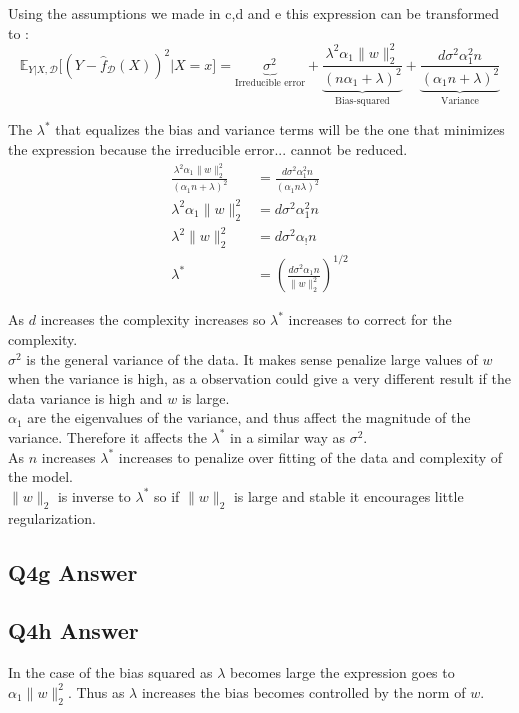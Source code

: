 \documentclass{article}
\newcommand{\1}{\mathbf{1}}
\def\E{\mathbb{E}}
\newcommand{\mc}[1]{\mathcal{#1}}
\begin{document}
Using the assumptions we made in c,d and e this expression can be transformed to :
$$\E_{Y|X,\mc{D}}\big[(Y-\widehat{f}_{\mc{D}}(X))^2 |X=x \big] = \underbrace{\sigma^2}_{\text{Irreducible error}} + \underbrace{\frac{\lambda^2 \alpha_1 \|w\|_2^2}{(n \alpha_1 + \lambda)^2}}_{\text{Bias-squared}} +
          \underbrace{\frac{d \sigma^2 \alpha_1^2 n}{(\alpha_1 n + \lambda)^2}}_{\text{Variance}} $$
    
The $\lambda^*$ that equalizes the bias and variance terms will be the one that minimizes the expression because the irreducible error... cannot be reduced.
\begin{align}
    \frac{\lambda^2\alpha_1\|w\|_2^2}{(\alpha_1 n + \lambda)^2} &= \frac{d\sigma^2 \alpha_1^2 n}{(\alpha_1 n 
    \lambda)^2}\\
    \lambda^2\alpha_1\|w\|_2^2 &= d\sigma^2\alpha_1^2 n\\
    \lambda^2\|w\|_2^2 &= d\sigma^2\alpha_! n\\
    \lambda^* &= \left(\frac{d\sigma^2\alpha_1 n}{\|w\|_2^2}\right)^{1/2}
\end{align}

As $d$ increases the complexity increases so $\lambda^*$ increases to correct for the complexity. \\
$\sigma^2$ is the general variance of the data. It makes sense penalize large values of $w$ when the variance is high, as a observation could give a very different result if the data variance is high and $w$ is large. \\
$\alpha_1$ are the eigenvalues of the variance, and thus affect the magnitude of the variance. Therefore it affects the $\lambda^*$ in a similar way as $\sigma^2$. \\
As $n$ increases $\lambda^*$ increases to penalize over fitting of the data and complexity of the model. \\
$\|w\|_2$ is inverse to $\lambda^*$ so if $\|w\|_2$ is large and stable it encourages little regularization. \\
    


\subsection{Q4g Answer}


\subsection{Q4h Answer}
In the case of the bias squared as $\lambda$ becomes large the expression goes to $\alpha_1 \|w\|^2_2$. Thus as $\lambda$ increases the bias becomes controlled by the norm of $w$. \\
\end{document}
